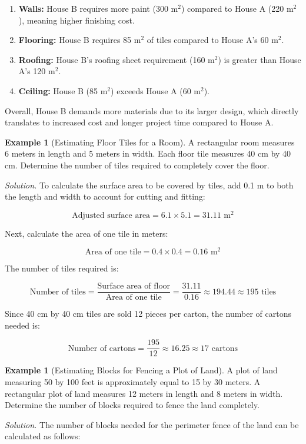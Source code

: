 \documentclass[12pt,a4paper,openany,titlepage,reqno, final]{report}
\theoremstyle{definition}
\newtheorem{exm}[dfn]{Example}
\begin{document}
	\begin{enumerate}
		\item \textbf{Walls:} House B requires more paint (300 m$^2$) compared to House A (220 m$^2$), meaning higher finishing cost.
		\item \textbf{Flooring:} House B requires 85 m$^2$ of tiles compared to House A’s 60 m$^2$.
		\item \textbf{Roofing:} House B’s roofing sheet requirement (160 m$^2$) is greater than House A’s 120 m$^2$.
		\item \textbf{Ceiling:} House B (85 m$^2$) exceeds House A (60 m$^2$).
	\end{enumerate}
	
	Overall, House B demands more materials due to its larger design, which directly translates to increased cost and longer project time compared to House A.
	
\begin{exm}[Estimating Floor Tiles for a Room]
	A rectangular room measures 6 meters in length and 5 meters in width. Each floor tile measures 40 cm by 40 cm. Determine the number of tiles required to completely cover the floor.
\end{exm}

\noindent \textit{Solution.} To calculate the surface area to be covered by tiles, add 0.1 m to both the length and width to account for cutting and fitting:

\[
\text{Adjusted surface area} = 6.1 \times 5.1 = 31.11 \text{ m}^2
\]

Next, calculate the area of one tile in meters:

\[
\text{Area of one tile} = 0.4 \times 0.4 = 0.16 \text{ m}^2
\]

The number of tiles required is:

\[
\text{Number of tiles} = \frac{\text{Surface area of floor}}{\text{Area of one tile}} = \frac{31.11}{0.16} \approx 194.44 \approx 195 \text{ tiles}
\]

Since 40 cm by 40 cm tiles are sold 12 pieces per carton, the number of cartons needed is:

\[
\text{Number of cartons} = \frac{195}{12} \approx 16.25 \approx 17 \text{ cartons}
\]
\begin{exm}[Estimating Blocks for Fencing a Plot of Land]	
	 A plot of land measuring 50 by 100 feet is approximately equal to 15 by 30 meters. A rectangular plot of land measures 12 meters in length and 8 meters in width. Determine the number of blocks required to fence the land completely.
	 \end{exm}
	 \noindent \textit{Solution.} The number of blocks needed for the perimeter fence of the land can be calculated as follows:
	 
\end{document}
